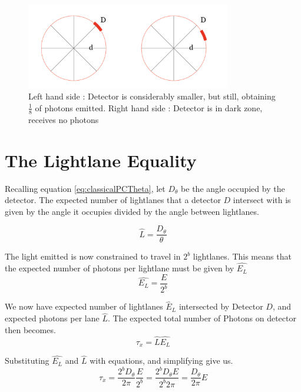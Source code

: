 \documentclass[notitlepage]{article}
\begin{document}
\begin{figure}[!ht]
  \centering

 \includegraphics[width=0.8\textwidth, trim={0cm 0cm 0cm 0cm},clip]{Illustrations/Fig2.pdf}
  \caption{Left hand side : Detector is considerably smaller, but still, obtaining $\frac{1}{8} $ of photons emitted. Right hand side : Detector is in dark zone, receives no photons }
    \label{fig:SmallDetector}
\end{figure}

\section{The Lightlane Equality }

Recalling equation \ref{eq:classicalPCTheta}, let $D_\theta$ be the angle occupied by the detector. The expected number of lightlanes that a detector $D$ intersect with is given by the angle it occupies divided by the angle between lightlanes.

\begin{equation}
\hat{L} =   \frac{D_\theta }{ \theta} 
\label{eq:expectedLightlanes}
\end{equation}

The light emitted is now constrained to travel in $2^b$ lightlanes. This means that the expected number of photons per lightlane must be given by $\hat{E_L}$
\begin{equation}
 \hat{E_L} = \frac{E}{2^b}
 \label{eq:expectedPhotonsPerLane}
\end{equation}

We now have expected number of lightlanes $\hat{E}_L$ intersected by Detector $D$,  and expected photons per lane  $\hat{L}$. The expected total number of Photons on detector then becomes.
\begin{equation}\label{eq:TauXdefinitionShort}
\tau_x =  \hat{L} \hat{E_L} 
\end{equation}

Substituting $\hat{E_L}$ and $\hat{L} $ with equations, and simplifying give us.
\begin{equation}
 \tau_x = \frac{2^b D_\theta}{2\pi} \frac{E}{2^b} = \frac{2^b D_\theta E}{2^b2\pi} =  \frac{ D_\theta}{2 \pi} E 
 \label{eq:Lightlaneequality}
\end{equation}
\end{document}
